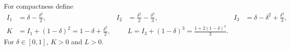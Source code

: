 For compactness define
\begin{align*}
 I_1&=\delta-\frac{\delta^2}{2}, &
 I_2&=\frac{\delta^2}{2}-\frac{\delta^3}{3}, &
 I_3&=\delta-\delta^2+\frac{\delta^3}{3},\\
 K&=I_1+(1-\delta)^2=1-\delta+\frac{\delta^2}{2},&&
 L=I_3+(1-\delta)^3=\frac{1+2(1-\delta)^3}{3}.
\end{align*}
For $\delta\in[0,1]$, $K>0$ and $L>0$.
